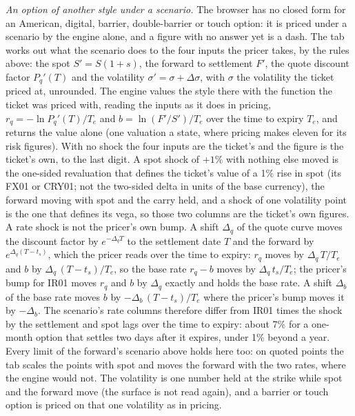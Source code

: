 \documentclass[11pt,a4paper]{article}
\begin{document}
\emph{An option of another style under a scenario.} The browser has no closed form for an American, digital, barrier, double-barrier or touch option: it is priced under a scenario by the engine alone, and a figure with no answer yet is a dash. The tab works out what the scenario does to the four inputs the pricer takes, by the rules above: the spot $S'=S(1+s)$, the forward to settlement $F'$, the quote discount factor $P_q'(T)$ and the volatility $\sigma'=\sigma+\Delta\sigma$, with $\sigma$ the volatility the ticket priced at, unrounded. The engine values the style there with the function the ticket was priced with, reading the inputs as it does in pricing, $r_q=-\ln P_q'(T)/T_e$ and $b=\ln(F'/S')/T_e$ over the time to expiry $T_e$, and returns the value alone (one valuation a state, where pricing makes eleven for its risk figures). With no shock the four inputs are the ticket's and the figure is the ticket's own, to the last digit. A spot shock of $+1\%$ with nothing else moved is the one-sided revaluation that defines the ticket's value of a 1\% rise in spot (its FX01 or CRY01; not the two-sided delta in units of the base currency), the forward moving with spot and the carry held, and a shock of one volatility point is the one that defines its vega, so those two columns are the ticket's own figures. A rate shock is not the pricer's own bump. A shift $\Delta_q$ of the quote curve moves the discount factor by $e^{-\Delta_q T}$ to the settlement date $T$ and the forward by $e^{\Delta_q (T-t_s)}$, which the pricer reads over the time to expiry: $r_q$ moves by $\Delta_q\,T/T_e$ and $b$ by $\Delta_q\,(T-t_s)/T_e$, so the base rate $r_q-b$ moves by $\Delta_q\,t_s/T_e$; the pricer's bump for IR01 moves $r_q$ and $b$ by $\Delta_q$ exactly and holds the base rate. A shift $\Delta_b$ of the base rate moves $b$ by $-\Delta_b\,(T-t_s)/T_e$ where the pricer's bump moves it by $-\Delta_b$. The scenario's rate columns therefore differ from IR01 times the shock by the settlement and spot lags over the time to expiry: about 7\% for a one-month option that settles two days after it expires, under 1\% beyond a year. Every limit of the forward's scenario above holds here too: on quoted points the tab scales the points with spot and moves the forward with the two rates, where the engine would not. The volatility is one number held at the strike while spot and the forward move (the surface is not read again), and a barrier or touch option is priced on that one volatility as in pricing.
\end{document}
